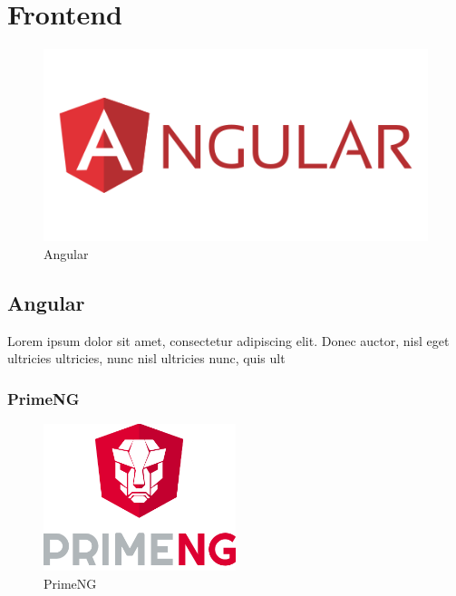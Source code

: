 \chapter{Frontend}
\begin{figure}[H]
\centering
\includegraphics[width=1\textwidth]{Images/angular.png}
\caption{\label{fig:frontend}Angular}
\end{figure}
\section{Angular}
Lorem ipsum dolor sit amet, consectetur adipiscing elit. Donec auctor, nisl eget ultricies ultricies, nunc nisl ultricies nunc, quis ult


\subsection{PrimeNG}
\begin{figure}[H]
\centering
\includegraphics[width=0.5\textwidth]{Images/primeng.png}
\caption{\label{fig:primeng}PrimeNG}
\end{figure}

